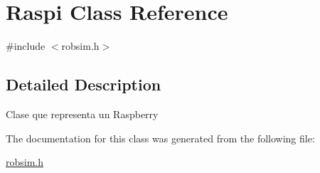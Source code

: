 \hypertarget{class_raspi}{}\section{Raspi Class Reference}
\label{class_raspi}


{\ttfamily \#include $<$robsim.\+h$>$}



\subsection{Detailed Description}
Clase que representa un Raspberry 

The documentation for this class was generated from the following file\+:\begin{DoxyCompactItemize}
\item 
\hyperlink{robsim_8h}{robsim.\+h}\end{DoxyCompactItemize}
